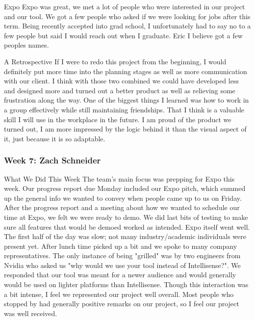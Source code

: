 Expo
Expo was great, we met a lot of people who were interested in our project and our tool. We got a few people who asked if we were looking for jobs after this term. Being recently accepted into grad school, I unfortunately had to say no to a few people but said I would reach out when I graduate. Eric I believe got a few peoples names.

A Retrospective
If I were to redo this project from the beginning, I would definitely put more time into the planning stages as well as more communication with our client. I think with those two combined we could have developed less and designed more and turned out a better product as well as relieving some frustration along the way. One of the biggest things I learned was how to work in a group effectively while still maintaining friendships. That I think is a valuable skill I will use in the workplace in the future. I am proud of the product we turned out, I am more impressed by the logic behind it than the visual aspect of it, just because it is so adaptable.   

\subsubsection{Week 7: Zach Schneider}

What We Did This Week
The team's main focus was prepping for Expo this week. Our progress report due Monday included our Expo pitch, which summed up the general info we wanted to convey when people came up to us on Friday. After the progress report and a meeting about how we wanted to schedule our time at Expo, we felt we were ready to demo. We did last bits of testing to make sure all features that would be demoed worked as intended. Expo itself went well. The first half of the day was slow; not many industry/academic individuals were present yet. After lunch time picked up a bit and we spoke to many company representatives. The only instance of being "grilled" was by two engineers from Nvidia who asked us "why would we use your tool instead of Intellisense?". We responded that our tool was meant for a newer audience and would generally would be used on lighter platforms than Intellisense. Though this interaction was a bit intense, I feel we represented our project well overall. Most people who stopped by had generally positive remarks on our project, so I feel our project was well received.


